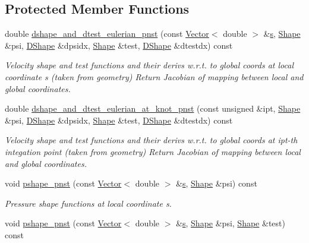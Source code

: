 \subsection*{Protected Member Functions}
\begin{DoxyCompactItemize}
\item 
double \hyperlink{classoomph_1_1PolarCrouzeixRaviartElement_acd23331a698b1dc87c9d309ed805430a}{dshape\+\_\+and\+\_\+dtest\+\_\+eulerian\+\_\+pnst} (const \hyperlink{classoomph_1_1Vector}{Vector}$<$ double $>$ \&\hyperlink{cfortran_8h_ab7123126e4885ef647dd9c6e3807a21c}{s}, \hyperlink{classoomph_1_1Shape}{Shape} \&psi, \hyperlink{classoomph_1_1DShape}{D\+Shape} \&dpsidx, \hyperlink{classoomph_1_1Shape}{Shape} \&test, \hyperlink{classoomph_1_1DShape}{D\+Shape} \&dtestdx) const
\begin{DoxyCompactList}\small\item\em Velocity shape and test functions and their derivs w.\+r.\+t. to global coords at local coordinate s (taken from geometry) Return Jacobian of mapping between local and global coordinates. \end{DoxyCompactList}\item 
double \hyperlink{classoomph_1_1PolarCrouzeixRaviartElement_aadee59b06f281e88d2a29707b9179bf5}{dshape\+\_\+and\+\_\+dtest\+\_\+eulerian\+\_\+at\+\_\+knot\+\_\+pnst} (const unsigned \&ipt, \hyperlink{classoomph_1_1Shape}{Shape} \&psi, \hyperlink{classoomph_1_1DShape}{D\+Shape} \&dpsidx, \hyperlink{classoomph_1_1Shape}{Shape} \&test, \hyperlink{classoomph_1_1DShape}{D\+Shape} \&dtestdx) const
\begin{DoxyCompactList}\small\item\em Velocity shape and test functions and their derivs w.\+r.\+t. to global coords at ipt-\/th integation point (taken from geometry) Return Jacobian of mapping between local and global coordinates. \end{DoxyCompactList}\item 
void \hyperlink{classoomph_1_1PolarCrouzeixRaviartElement_a1898936dd70065cb4054d1e1ba6a9d49}{pshape\+\_\+pnst} (const \hyperlink{classoomph_1_1Vector}{Vector}$<$ double $>$ \&\hyperlink{cfortran_8h_ab7123126e4885ef647dd9c6e3807a21c}{s}, \hyperlink{classoomph_1_1Shape}{Shape} \&psi) const
\begin{DoxyCompactList}\small\item\em Pressure shape functions at local coordinate s. \end{DoxyCompactList}\item 
void \hyperlink{classoomph_1_1PolarCrouzeixRaviartElement_a919b450ac1bb494ca96b94b717a9a37b}{pshape\+\_\+pnst} (const \hyperlink{classoomph_1_1Vector}{Vector}$<$ double $>$ \&\hyperlink{cfortran_8h_ab7123126e4885ef647dd9c6e3807a21c}{s}, \hyperlink{classoomph_1_1Shape}{Shape} \&psi, \hyperlink{classoomph_1_1Shape}{Shape} \&test) const

\end{DoxyCompactItemize}
